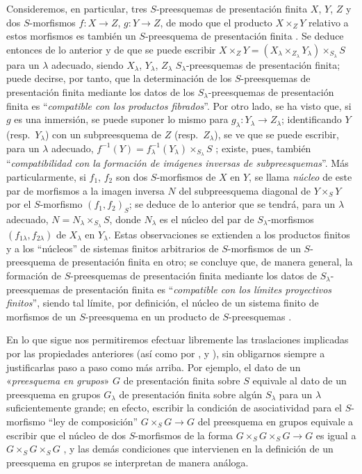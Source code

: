 \begin{env}[8.8.3]
Consideremos, en particular, tres $S$-preesquemas de presentación finita $X$, $Y$, $Z$ y dos $S$-morfismos $f:X\to Z$, $g:Y\to Z$, de modo que el producto $X\times_ZY$ relativo a estos morfismos es también un $S$-preesquema de presentación finita .
Se deduce entonces de lo anterior y de  que se puede escribir $X\times_ZY=(X_\lambda\times_{Z_\lambda}Y_\lambda)\times_{S_\lambda}S$ para un $\lambda$ adecuado, siendo $X_\lambda$, $Y_\lambda$, $Z_\lambda$ $S_\lambda$-preesquemas de presentación finita; puede decirse, por tanto, que la determinación de los $S$-preesquemas de presentación finita mediante los datos de los $S_\lambda$-preesquemas de presentación finita es ``\emph{compatible con los productos fibrados}''.
Por otro lado, se ha visto  que, si $g$ es una inmersión, se puede suponer lo mismo para $g_\lambda:Y_\lambda\to Z_\lambda$; identificando $Y$ (resp.\ $Y_\lambda$) con un subpreesquema de $Z$ (resp.\ $Z_\lambda$), se ve que se puede escribir, para un $\lambda$ adecuado, $f^{-1}(Y)=f_\lambda^{-1}(Y_\lambda)\times_{S_\lambda}S$ ;
existe, pues, también ``\emph{compatibilidad con la formación de imágenes inversas de subpreesquemas}''.
Más particularmente, si $f_1$, $f_2$ son dos $S$-morfismos de $X$ en $Y$, se llama \emph{núcleo} de este par de morfismos a la imagen inversa $N$ del subpreesquema diagonal de $Y\times_SY$ por el $S$-morfismo $(f_1,f_2)_S$; se deduce de lo anterior que se tendrá, para un $\lambda$ adecuado, $N=N_\lambda\times_{S_\lambda}S$, donde $N_\lambda$ es el núcleo del par de $S_\lambda$-morfismos $(f_{1\lambda},f_{2\lambda})$ de $X_\lambda$ en $Y_\lambda$.
Estas observaciones se extienden a los productos finitos y a los ``núcleos'' de sistemas finitos arbitrarios de $S$-morfismos de un $S$-preesquema de presentación finita en
otro; se concluye que, de manera general, la formación de $S$-preesquemas de presentación finita mediante los datos de $S_\lambda$-preesquemas de presentación finita es ``\emph{compatible con los límites proyectivos finitos}'', siendo tal límite, por definición, el núcleo de un sistema finito de morfismos de un $S$-preesquema en un producto de $S$-preesquemas .

En lo que sigue nos permitiremos efectuar libremente las traslaciones implicadas por las propiedades anteriores (así como por ,  y ), sin obligarnos siempre a justificarlas paso a paso como más arriba.
Por ejemplo, el dato de un «\emph{preesquema en grupos}» $G$ de presentación finita sobre $S$ equivale al dato de un preesquema en grupos $G_\lambda$ de presentación finita sobre algún $S_\lambda$ para un $\lambda$ suficientemente grande; en efecto, escribir la condición de asociatividad para el $S$-morfismo ``ley de composición'' $G\times_SG\to G$ del preesquema en grupos equivale a escribir que el núcleo de dos $S$-morfismos de la forma $G\times_SG\times_SG\to G$ es igual a $G\times_SG\times_SG$ , y las demás condiciones que intervienen en la definición de un preesquema en grupos se interpretan de manera análoga.
\end{env}

